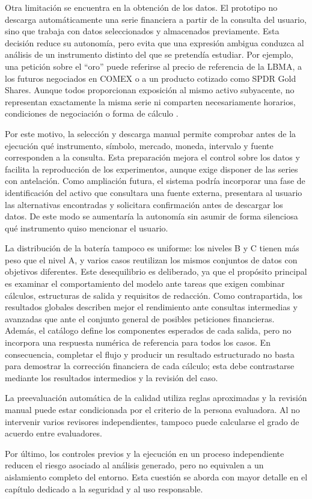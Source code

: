 Otra limitación se encuentra en la obtención de los datos. El prototipo no descarga automáticamente una serie financiera a partir de la consulta del usuario, sino que trabaja con datos seleccionados y almacenados previamente. Esta decisión reduce su autonomía, pero evita que una expresión ambigua conduzca al análisis de un instrumento distinto del que se pretendía estudiar. Por ejemplo, una petición sobre el ``oro'' puede referirse al precio de referencia de la LBMA, a los futuros negociados en COMEX o a un producto cotizado como SPDR Gold Shares. Aunque todos proporcionan exposición al mismo activo subyacente, no representan exactamente la misma serie ni comparten necesariamente horarios, condiciones de negociación o forma de cálculo \cite{lbmagoldprice,cmegoldfutures,spdrgoldshares}.

Por este motivo, la selección y descarga manual permite comprobar antes de la ejecución qué instrumento, símbolo, mercado, moneda, intervalo y fuente corresponden a la consulta. Esta preparación mejora el control sobre los datos y facilita la reproducción de los experimentos, aunque exige disponer de las series con antelación. Como ampliación futura, el sistema podría incorporar una fase de identificación del activo que consultara una fuente externa, presentara al usuario las alternativas encontradas y solicitara confirmación antes de descargar los datos. De este modo se aumentaría la autonomía sin asumir de forma silenciosa qué instrumento quiso mencionar el usuario.

La distribución de la batería tampoco es uniforme: los niveles B y C tienen más peso que el nivel A, y varios casos reutilizan los mismos conjuntos de datos con objetivos diferentes. Este desequilibrio es deliberado, ya que el propósito principal es examinar el comportamiento del modelo ante tareas que exigen combinar cálculos, estructuras de salida y requisitos de redacción. Como contrapartida, los resultados globales describen mejor el rendimiento ante consultas intermedias y avanzadas que ante el conjunto general de posibles peticiones financieras. Además, el catálogo define los componentes esperados de cada salida, pero no incorpora una respuesta numérica de referencia para todos los casos. En consecuencia, completar el flujo y producir un resultado estructurado no basta para demostrar la corrección financiera de cada cálculo; esta debe contrastarse mediante los resultados intermedios y la revisión del caso.

La preevaluación automática de la calidad utiliza reglas aproximadas y la revisión manual puede estar condicionada por el criterio de la persona evaluadora. Al no intervenir varios revisores independientes, tampoco puede calcularse el grado de acuerdo entre evaluadores.

Por último, los controles previos y la ejecución en un proceso independiente reducen el riesgo asociado al análisis generado, pero no equivalen a un aislamiento completo del entorno. Esta cuestión se aborda con mayor detalle en el capítulo dedicado a la seguridad y al uso responsable.

